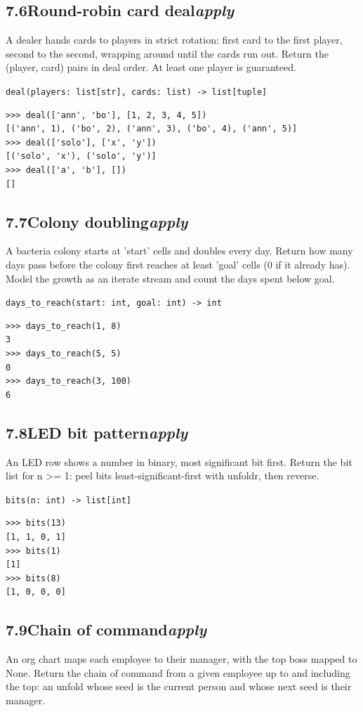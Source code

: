 \documentclass[10pt,letterpaper]{book}
\begin{document}
\subsection*{7.6\quad Round-robin card deal\hfill\textnormal{\textit{apply}}}
A dealer hands cards to players in strict rotation: first card to the first player, second to the second, wrapping around until the cards run out. Return the (player, card) pairs in deal order. At least one player is guaranteed.

\noindent\texttt{deal(players: list[str], cards: list) -> list[tuple]}
\begin{lstlisting}[style=ex]
>>> deal(['ann', 'bo'], [1, 2, 3, 4, 5])
[('ann', 1), ('bo', 2), ('ann', 3), ('bo', 4), ('ann', 5)]
>>> deal(['solo'], ['x', 'y'])
[('solo', 'x'), ('solo', 'y')]
>>> deal(['a', 'b'], [])
[]
\end{lstlisting}
\subsection*{7.7\quad Colony doubling\hfill\textnormal{\textit{apply}}}
A bacteria colony starts at 'start' cells and doubles every day. Return how many days pass before the colony first reaches at least 'goal' cells (0 if it already has). Model the growth as an iterate stream and count the days spent below goal.

\noindent\texttt{days\_to\_reach(start: int, goal: int) -> int}
\begin{lstlisting}[style=ex]
>>> days_to_reach(1, 8)
3
>>> days_to_reach(5, 5)
0
>>> days_to_reach(3, 100)
6
\end{lstlisting}

\subsection*{7.8\quad LED bit pattern\hfill\textnormal{\textit{apply}}}
An LED row shows a number in binary, most significant bit first. Return the bit list for n >= 1: peel bits least-significant-first with unfoldr, then reverse.

\noindent\texttt{bits(n: int) -> list[int]}
\begin{lstlisting}[style=ex]
>>> bits(13)
[1, 1, 0, 1]
>>> bits(1)
[1]
>>> bits(8)
[1, 0, 0, 0]
\end{lstlisting}
\subsection*{7.9\quad Chain of command\hfill\textnormal{\textit{apply}}}
An org chart maps each employee to their manager, with the top boss mapped to None. Return the chain of command from a given employee up to and including the top: an unfold whose seed is the current person and whose next seed is their manager.
\end{document}
